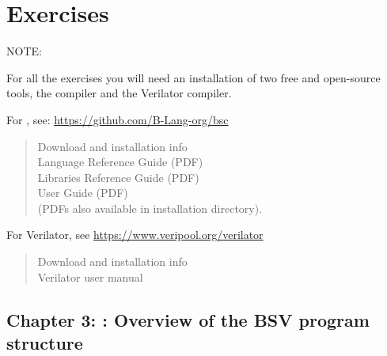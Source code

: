 

\chapter{Exercises}


\setcounter{page}{1}
\renewcommand{\thepage}{\Alph{chapter}-\arabic{page}}

\label{apx_exercises}


NOTE: 

For all the exercises you will need an installation of two free and
open-source tools, the {\bsc} compiler and the Verilator compiler.

For {\bsc}, see: \url{https://github.com/B-Lang-org/bsc}
\begin{quote}
    Download and installation info \\
    {\BSV} Language Reference Guide (PDF) \\
    {\BSV} Libraries Reference Guide (PDF) \\
    {\bsc} User Guide (PDF) \\
    (PDFs also available in {\bsc} installation directory).
\end{quote}

For Verilator, see \url{https://www.veripool.org/verilator}
\begin{quote}
    Download and installation info \\
    Verilator user manual \\
\end{quote}


\hdivider

\section*{Chapter 3: {\BSV}: Overview of the BSV program structure}

